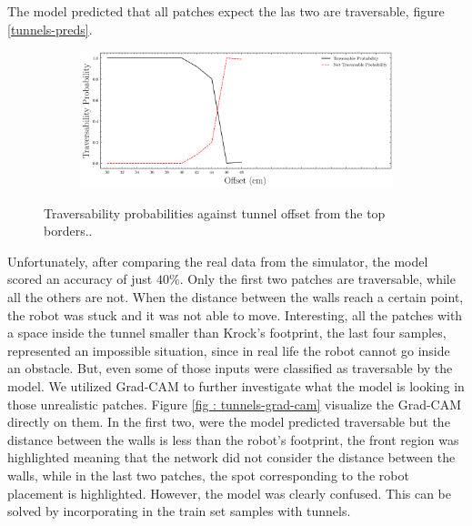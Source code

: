 \documentclass[../document.tex]{subfiles}
\begin{document}
The model predicted that all patches expect the las two are traversable, figure \ref{tunnels-preds}. 
\begin{figure}[htbp]
    \centering
\begin{subfigure}[b]{1\textwidth}
    \includegraphics[width=\linewidth]{../img/5/custom_patches/tunnel/predictions.png}
    \end{subfigure}
    \caption{Traversability probabilities against tunnel offset from the top borders..}
    \label{fig: tunnels-preds}
\end{figure}
Unfortunately, after comparing the real data from the simulator, the model scored an accuracy of just $40\%$. Only the first two patches are traversable, while all the others are not. When the distance between the walls reach a certain point, the robot was stuck and it was not able to move. Interesting, all the patches with a space inside the tunnel smaller than Krock's footprint, the last four samples, represented an impossible situation, since in real life the robot cannot go inside an obstacle. But, even some of those inputs were classified as traversable by the model. We utilized Grad-CAM to further investigate what the model is looking in those unrealistic patches. Figure \ref{fig : tunnels-grad-cam} visualize the Grad-CAM directly on them. In the first two, were the model predicted traversable but the distance between the walls is less than the robot's footprint, the front region was highlighted meaning that the network did not consider the distance between the walls, while in the last two patches, the spot corresponding to the robot placement is highlighted. However, the model was clearly confused. This can be solved by incorporating in the train set samples with tunnels.
\end{document}
